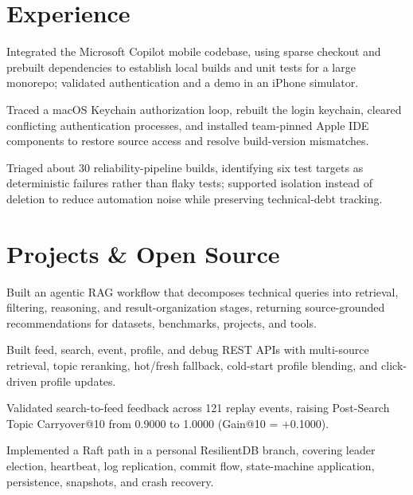 \documentclass[letterpaper,10pt]{article}
\begin{document}
\section{Experience}
\resumeSubHeadingListStart
{}
\resumeItemListStart
  \item Integrated the Microsoft Copilot mobile codebase, using sparse checkout and prebuilt dependencies to establish local builds and unit tests for a large monorepo; validated authentication and a demo in an iPhone simulator.
  \item Traced a macOS Keychain authorization loop, rebuilt the login keychain, cleared conflicting authentication processes, and installed team-pinned Apple IDE components to restore source access and resolve build-version mismatches.
  \item Triaged about 30 reliability-pipeline builds, identifying six test targets as deterministic failures rather than flaky tests; supported isolation instead of deletion to reduce automation noise while preserving technical-debt tracking.
\resumeItemListEnd
\resumeSubHeadingListEnd

\section{Projects \& Open Source}
\resumeSubHeadingListStart
{}
\resumeItemListStart
  \item Built an agentic RAG workflow that decomposes technical queries into retrieval, filtering, reasoning, and result-organization stages, returning source-grounded recommendations for datasets, benchmarks, projects, and tools.
\resumeItemListEnd
{}
\resumeItemListStart
  \item Built feed, search, event, profile, and debug REST APIs with multi-source retrieval, topic reranking, hot/fresh fallback, cold-start profile blending, and click-driven profile updates.
  \item Validated search-to-feed feedback across 121 replay events, raising Post-Search Topic Carryover@10 from 0.9000 to 1.0000 (Gain@10 = +0.1000).
\resumeItemListEnd
{}
\resumeItemListStart
  \item Implemented a Raft path in a personal ResilientDB branch, covering leader election, heartbeat, log replication, commit flow, state-machine application, persistence, snapshots, and crash recovery.
\resumeItemListEnd
\resumeSubHeadingListEnd
\end{document}
